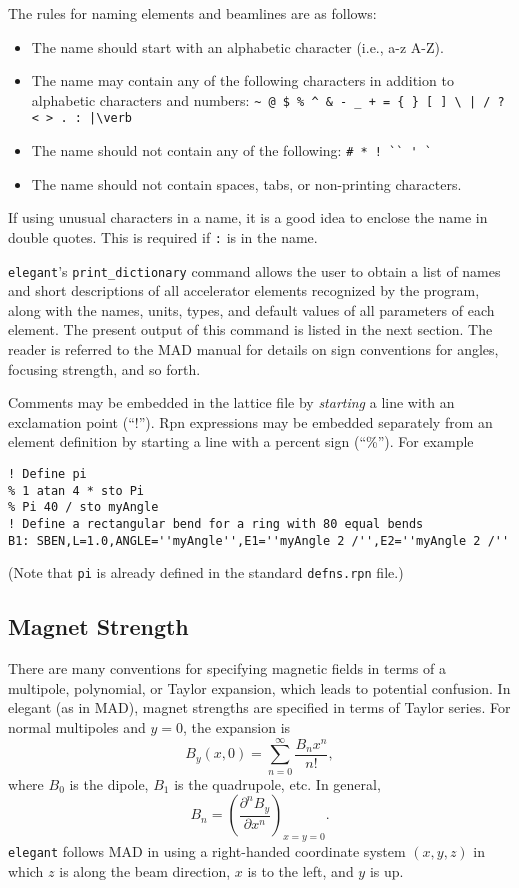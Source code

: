 \documentclass[11pt]{article}
\begin{document}
The rules for naming elements and beamlines are as follows:
\begin{itemize}
\item The name should start with an alphabetic character (i.e., a-z A-Z).
\item The name may contain any of the following characters in addition to
alphabetic characters and numbers: 
\verb#~ @ $ % ^ & - _ + = { } [ ] \ | / ? < > . : |\verb#
\item The name should not contain any of the following: \verb|# * ! `` ' `|
\item The name should not contain spaces, tabs, or non-printing characters.
\end{itemize}
If using unusual characters in a name, it is a good idea to enclose the name
in double quotes.   This is required if \verb|:| is in the name.

{\tt elegant}'s \verb|print_dictionary| command allows the user to
obtain a list of names and short descriptions of all accelerator
elements recognized by the program, along with the names, units,
types, and default values of all parameters of each element. 
The present output of this command is listed in the next section.
The reader is referred to the MAD manual\cite{MAD} for details on sign
conventions for angles, focusing strength, and so forth.  

Comments may be embedded in the lattice file by {\em starting} a line with 
an exclamation point (``!'').
Rpn expressions may be embedded separately
from an element definition by starting a line with a percent sign (``\%'').
For example
\begin{verbatim}
! Define pi
% 1 atan 4 * sto Pi
% Pi 40 / sto myAngle
! Define a rectangular bend for a ring with 80 equal bends
B1: SBEN,L=1.0,ANGLE=''myAngle'',E1=''myAngle 2 /'',E2=''myAngle 2 /''
\end{verbatim}
(Note that {\tt pi} is already defined in the standard {\tt defns.rpn} file.)

\subsection{Magnet Strength}

There are many conventions for specifying magnetic fields in terms of a multipole, polynomial, or Taylor expansion, which leads to
potential confusion.
In elegant (as in MAD\cite{MAD}), magnet strengths are specified in terms of Taylor series.
For normal multipoles and $y=0$, the expansion is
\begin{equation}
B_y(x,0)= \sum_{n=0}^\infty \frac{B_n x^n}{n!},
\end{equation}
where $B_0$ is the dipole, $B_1$ is the quadrupole, etc.
In general,
\begin{equation}
B_n = \left(\frac{\partial^n B_y}{\partial x^n}\right)_{x=y=0}.
\end{equation}
{\tt elegant} follows MAD \cite{MAD} in using a right-handed coordinate system $(x, y, z)$ 
in which $z$ is along the beam direction, $x$ is to the left, and $y$ is up.
\end{document}
